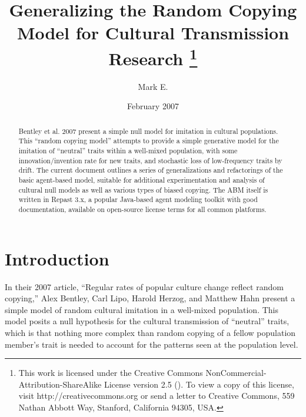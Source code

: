\documentclass{kluwer-mem-copyright}
\begin{document}
\begin{article}
\begin{opening}
\title{Generalizing the Random Copying Model for Cultural Transmission Research
\thanks{This work is licensed under the Creative Commons NonCommercial-Attribution-ShareAlike License version 2.5 (\byncsa). 
To view a copy of this license, visit http://creativecommons.org or send a letter to 
Creative Commons, 559 Nathan Abbott Way, Stanford, California 94305, USA.}} 


\author{Mark E. }  


\date{February 2007}

\begin{abstract}
Bentley et al. 2007 present a simple null model for imitation in cultural populations.  
This ``random copying model'' attempts to provide a simple generative model for the imitation of 
``neutral'' traits within a well-mixed population, with some innovation/invention rate for 
new traits, and stochastic loss of low-frequency traits by drift.  The current document 
outlines a series of generalizations and refactorings of the basic agent-based model,
suitable for additional
experimentation and analysis of cultural null models as well as various types of biased copying.  
The ABM itself is written in Repast 3.x, a popular Java-based agent modeling toolkit with good 
documentation, available on open-source license terms for all common platforms.
\end{abstract}


\end{opening}

\section{Introduction}
In their 2007 article, ``Regular rates of popular culture change reflect random copying,'' Alex Bentley, 
Carl Lipo, Harold Herzog, and Matthew Hahn present a simple model of random cultural imitation in a well-mixed
population.  This model posits a null hypothesis for the cultural transmission of ``neutral'' traits, which 
is that nothing more complex than random copying of a fellow population member's trait is needed to 
account for the patterns seen at the population level.  


\end{article}
\end{document}
